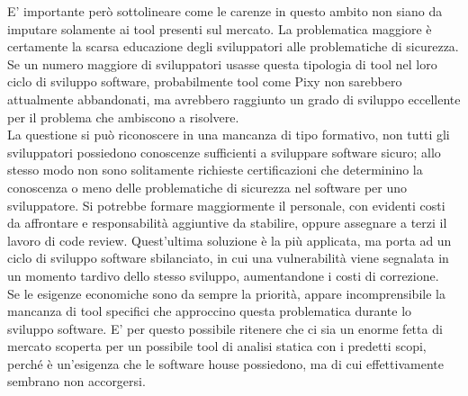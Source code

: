 E' importante però sottolineare come le carenze in questo ambito non siano da imputare solamente ai tool presenti sul mercato. La problematica maggiore è certamente la scarsa educazione degli sviluppatori alle problematiche di sicurezza. Se un numero maggiore di sviluppatori usasse questa tipologia di tool nel loro ciclo di sviluppo software, probabilmente tool come Pixy non sarebbero attualmente abbandonati, ma avrebbero raggiunto un grado di sviluppo eccellente per il problema che ambiscono a risolvere.\\
La questione si può riconoscere in una mancanza di tipo formativo, non tutti gli sviluppatori possiedono conoscenze sufficienti a sviluppare software sicuro; allo stesso modo non sono solitamente richieste certificazioni che determinino la conoscenza o meno delle problematiche di sicurezza nel software per uno sviluppatore. Si potrebbe formare maggiormente il personale, con evidenti costi da affrontare e responsabilità aggiuntive da stabilire, oppure assegnare a terzi il lavoro di code review. Quest'ultima soluzione è la più applicata, ma porta ad un ciclo di sviluppo software sbilanciato, in cui una vulnerabilità viene segnalata in un momento tardivo dello stesso sviluppo, aumentandone i costi di correzione.\\
Se le esigenze economiche sono da sempre la priorità, appare incomprensibile la mancanza di tool specifici che approccino questa problematica durante lo sviluppo software. E' per questo possibile ritenere che ci sia un enorme fetta di mercato scoperta per un possibile tool di analisi statica con i predetti scopi, perché è un'esigenza che le software house possiedono, ma di cui effettivamente sembrano non accorgersi.
  

